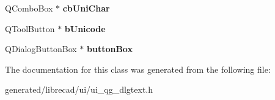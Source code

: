 \begin{DoxyCompactItemize}
\item 
\hypertarget{classUi__QG__DlgText_a9a8b8dc44cc905005e0db3764a417238}{Q\-Combo\-Box $\ast$ {\bfseries cb\-Uni\-Char}}\label{classUi__QG__DlgText_a9a8b8dc44cc905005e0db3764a417238}

\item 
\hypertarget{classUi__QG__DlgText_ab0afabdee43b28c961e55fb9bc2398fe}{Q\-Tool\-Button $\ast$ {\bfseries b\-Unicode}}\label{classUi__QG__DlgText_ab0afabdee43b28c961e55fb9bc2398fe}

\item 
\hypertarget{classUi__QG__DlgText_acdb73e4dc00262c732f8de7db3119339}{Q\-Dialog\-Button\-Box $\ast$ {\bfseries button\-Box}}\label{classUi__QG__DlgText_acdb73e4dc00262c732f8de7db3119339}

\end{DoxyCompactItemize}


The documentation for this class was generated from the following file\-:\begin{DoxyCompactItemize}
\item 
generated/librecad/ui/ui\-\_\-qg\-\_\-dlgtext.\-h\end{DoxyCompactItemize}
